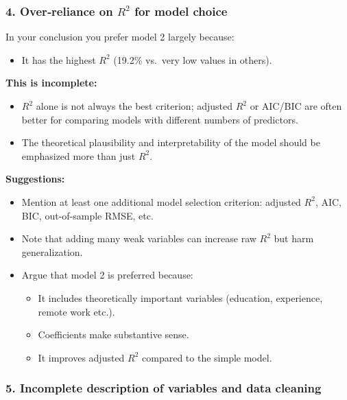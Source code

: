 \documentclass[
  letterpaper,
  DIV=11,
  numbers=noendperiod]{scrartcl}
\providecommand{\tightlist}{%
  \setlength{\itemsep}{0pt}\setlength{\parskip}{0pt}}
\begin{document}
\subsubsection{\texorpdfstring{4. Over‑reliance on \(R^2\) for model
choice}{4. Over‑reliance on R\^{}2 for model choice}}\label{overreliance-on-r2-for-model-choice}

In your conclusion you prefer model 2 largely because:

\begin{itemize}
\tightlist
\item
  It has the highest \(R^2\) (19.2\% vs.~very low values in others).
\end{itemize}

\textbf{This is incomplete:}

\begin{itemize}
\tightlist
\item
  \(R^2\) alone is not always the best criterion; adjusted \(R^2\) or
  AIC/BIC are often better for comparing models with different numbers
  of predictors.\\
\item
  The theoretical plausibility and interpretability of the model should
  be emphasized more than just \(R^2\).
\end{itemize}

\textbf{Suggestions:}

\begin{itemize}
\tightlist
\item
  Mention at least one additional model selection criterion: adjusted
  \(R^2\), AIC, BIC, out-of-sample RMSE, etc.\\
\item
  Note that adding many weak variables can increase raw \(R^2\) but harm
  generalization.\\
\item
  Argue that model 2 is preferred because:

  \begin{itemize}
  \tightlist
  \item
    It includes theoretically important variables (education,
    experience, remote work etc.).
  \item
    Coefficients make substantive sense.
  \item
    It improves adjusted \(R^2\) compared to the simple model.
  \end{itemize}
\end{itemize}

\subsubsection{5. Incomplete description of variables and data
cleaning}\label{incomplete-description-of-variables-and-data-cleaning}
\end{document}

